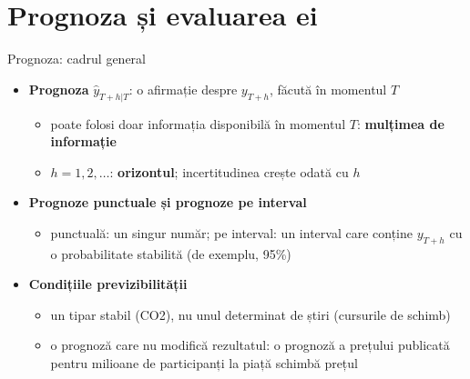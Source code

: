 \section{Prognoza și evaluarea ei}

\begin{frame}{Prognoza: cadrul general}
\itemsize{\small}
\begin{itemize}
    \item \textbf{Prognoza} $\hat y_{T+h|T}$: o afirmație despre $y_{T+h}$, făcută în momentul $T$
    \begin{itemize}
        \item poate folosi doar informația disponibilă în momentul $T$: \textbf{mulțimea de informație}
        \item $h = 1, 2, \ldots$: \textbf{orizontul}; incertitudinea crește odată cu $h$
    \end{itemize}
    \item \textbf{Prognoze punctuale și prognoze pe interval}
    \begin{itemize}
        \item punctuală: un singur număr; pe interval: un interval care conține $y_{T+h}$ cu o probabilitate stabilită (de exemplu, 95\%)
    \end{itemize}
    \item \textbf{Condițiile previzibilității}
    \begin{itemize}
        \item un tipar stabil (CO2), nu unul determinat de știri (cursurile de schimb)
        \item o prognoză care nu modifică rezultatul: o prognoză a prețului publicată pentru milioane de participanți la piață schimbă prețul
    \end{itemize}
\end{itemize}
\end{frame}

